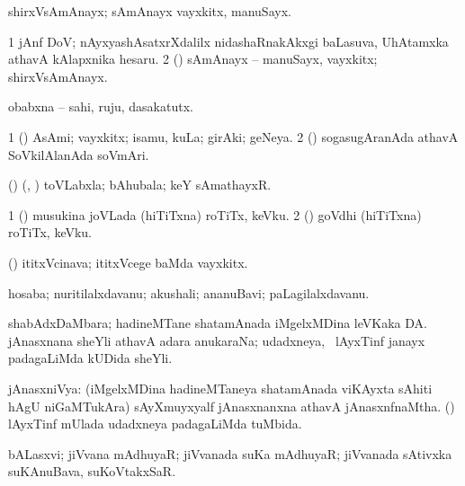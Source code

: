 \bentry
{}
\gl{\nA}
\bmng
shirxVsAmAnayx; sAmAnayx vayxkitx, manuSayx. 
\emng
\eentry

\bentry
{}
\gl{\nA}
\bmng
\bnum
\num{1} jAnf DoV; nAyxyashAsatxrXdalilx nidashaRnakAkxgi baLasuva, UhAtamxka athavA kAlapxnika hesaru. 
\num{2} (\ame) sAmAnayx -- manuSayx, vayxkitx; shirxVsAmAnayx. 
\enum
\emng
\eentry

\bentry
{}
\gl{\nA}
\bmng
obabxna -- sahi, ruju, dasakatutx. 
\emng
\eentry

\bentry
{}
\gl{\nA}
\bmng
\bnum
\num{1} (\AmA) AsAmi; vayxkitx; isamu, kuLa; girAki; geNeya. 
\num{2} (\kanmu) sogasugAranAda athavA SoVkilAlanAda soVmAri. 
\enum
\emng
\eentry

\bentry
{}
\gl{\nA}
\bmng
(\birx) (\nw, \ashi) toVLabxla; bAhubala; keY sAmathayxR. 
\emng
\eentry

\bentry
{}
\gl{\nA}
\bmng
\bnum
\num{1} (\ame) musukina joVLada (hiTiTxna) roTiTx, keVku. 
\num{2} (\AseTxrXV) goVdhi (hiTiTxna) roTiTx, keVku. 
\enum
\emng
\eentry

\bentry
{}
\gl{\nA}
\bmng
(\AmA) ititxVcinava; ititxVcege baMda vayxkitx. 
\emng
\eentry

\bentry
{}
\gl{\nA}
\bmng
hosaba; nuritilalxdavanu; akushali; ananuBavi; paLagilalxdavanu. 
\emng
\eentry

\bentry
{}
\gl{\nA}
\bmng
shabAdxDaMbara; hadineMTane shatamAnada iMgelxMDina leVKaka DA. jAnasxnana sheYli athavA adara anukaraNa; udadxneya, \kanmu\ lAyxTinf janayx padagaLiMda kUDida sheYli. 
\emng
\eentry

\bentry
{}
\gl{\gu}
\bmng
jAnasxniVya: 
\banum
{} (iMgelxMDina hadineMTaneya shatamAnada viKAyxta sAhiti hAgU niGaMTukAra) sAyXmuyxyalf jAnasxnanxna athavA jAnasxnfnaMtha. 
 (\kanmu) lAyxTinf mUlada udadxneya padagaLiMda tuMbida. 
\eanum
\emng
\eentry

\bentry
{}
\gl{\nA}
\expl{\F}
\bmng
bALasxvi; jiVvana mAdhuyaR; jiVvanada suKa mAdhuyaR; jiVvanada sAtivxka suKAnuBava, suKoVtakxSaR. 
\emng
\eentry

